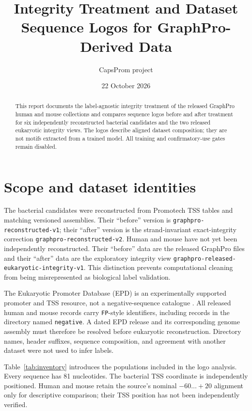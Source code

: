 \documentclass[11pt]{article}
\title{Integrity Treatment and Dataset Sequence Logos for GraphPro-Derived Data}
\author{CapsProm project}
\date{22 October 2026}
\begin{document}
\maketitle

\begin{abstract}
This report documents the label-agnostic integrity treatment of the released
GraphPro human and mouse collections and compares sequence logos before and
after treatment for six independently reconstructed bacterial candidates and
the two released eukaryotic integrity views. The logos describe aligned dataset
composition; they are not motifs extracted from a trained model. All training
and confirmatory-use gates remain disabled.
\end{abstract}

\section{Scope and dataset identities}

The bacterial candidates were reconstructed from Promotech TSS tables and
matching versioned assemblies. Their ``before'' version is
\texttt{graphpro-reconstructed-v1}; their ``after'' version is the
strand-invariant exact-integrity correction
\texttt{graphpro-reconstructed-v2}. Human and mouse have not yet been
independently reconstructed. Their ``before'' data are the released GraphPro
files and their ``after'' data are the exploratory integrity view
\texttt{graphpro-released-eukaryotic-integrity-v1}. This distinction prevents
computational cleaning from being misrepresented as biological label
validation.

The Eukaryotic Promoter Database (EPD) is an experimentally supported promoter
and TSS resource, not a negative-sequence catalogue
\cite{meylan2020epd}. All released human and mouse records carry
\texttt{FP}-style identifiers, including records in the directory named
\texttt{negative}. A dated EPD release and its corresponding genome assembly
must therefore be resolved before eukaryotic reconstruction. Directory names,
header suffixes, sequence composition, and agreement with another dataset were
not used to infer labels.

Table~\ref{tab:inventory} introduces the populations included in the logo
analysis. Every sequence has 81 nucleotides. The bacterial TSS coordinate is
independently positioned. Human and mouse retain the source's nominal
$-60\ldots+20$ alignment only for descriptive comparison; their TSS position
has not been independently verified.
\end{document}
